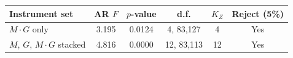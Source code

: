 \begin{tabular}{@{}lccccc@{}}
\toprule
Instrument set & AR $F$ & $p$-value & d.f. & $K_Z$ & Reject (5\%) \\
\midrule
$M\cdot G$ only & 3.195 & 0.0124 & 4, 83,127 & 4 & Yes \\
$M$, $G$, $M\cdot G$ stacked & 4.816 & 0.0000 & 12, 83,113 & 12 & Yes \\
\bottomrule
\end{tabular}
